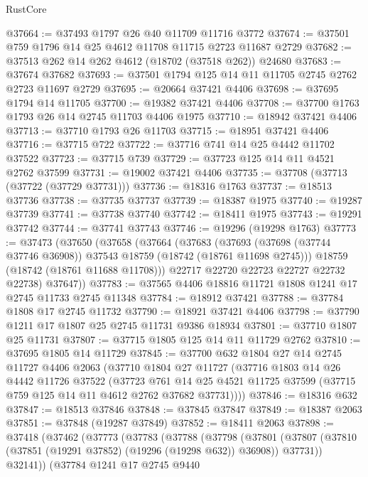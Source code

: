 \begin{lexlean}{RustCore}
\begin{coremodule}
@37664 := @37493 @1797 @26 @40 @11709 @11716 @3772
@37674 := @37501 @759 @1796 @14 @25 @4612 @11708 @11715 @2723 @11687 @2729
@37682 := @37513 @262 @14 @262 @4612 (@18702 (@37518 @262)) @24680
@37683 := @37674 @37682
@37693 := @37501 @1794 @125 @14 @11 @11705 @2745 @2762 @2723 @11697 @2729
@37695 := @20664 @37421 @4406
@37698 := @37695 @1794 @14 @11705
@37700 := @19382 @37421 @4406
@37708 := @37700 @1763 @1793 @26 @14 @2745 @11703 @4406 @1975
@37710 := @18942 @37421 @4406
@37713 := @37710 @1793 @26 @11703
@37715 := @18951 @37421 @4406
@37716 := @37715 @722
@37722 := @37716 @741 @14 @25 @4442 @11702 @37522
@37723 := @37715 @739
@37729 := @37723 @125 @14 @11 @4521 @2762 @37599
@37731 := @19002 @37421 @4406
@37735 := @37708 (@37713 (@37722 (@37729 @37731)))
@37736 := @18316 @1763
@37737 := @18513 @37736
@37738 := @37735 @37737
@37739 := @18387 @1975
@37740 := @19287 @37739
@37741 := @37738 @37740
@37742 := @18411 @1975
@37743 := @19291 @37742
@37744 := @37741 @37743
@37746 := @19296 (@19298 @1763)
@37773 := @37473
    (@37650
      (@37658
        (@37664
          (@37683
            (@37693 (@37698 (@37744 @37746 @36908)) @37543 @18759 (@18742 (@18761 @11698 @2745)))
            @18759
            (@18742 (@18761 @11688 @11708)))
          @22717
          @22720
          @22723
          @22727
          @22732
          @22738)
        @37647))
@37783 := @37565 @4406 @18816 @11721 @1808 @1241 @17 @2745 @11733 @2745 @11348
@37784 := @18912 @37421
@37788 := @37784 @1808 @17 @2745 @11732
@37790 := @18921 @37421 @4406
@37798 := @37790 @1211 @17 @1807 @25 @2745 @11731 @9386 @18934
@37801 := @37710 @1807 @25 @11731
@37807 := @37715 @1805 @125 @14 @11 @11729 @2762
@37810 := @37695 @1805 @14 @11729
@37845 := @37700
    @632
    @1804
    @27
    @14
    @2745
    @11727
    @4406
    @2063
    (@37710
      @1804
      @27
      @11727
      (@37716
        @1803
        @14
        @26
        @4442
        @11726
        @37522
        (@37723
          @761
          @14
          @25
          @4521
          @11725
          @37599
          (@37715 @759 @125 @14 @11 @4612 @2762 @37682 @37731))))
@37846 := @18316 @632
@37847 := @18513 @37846
@37848 := @37845 @37847
@37849 := @18387 @2063
@37851 := @37848 (@19287 @37849)
@37852 := @18411 @2063
@37898 := @37418
    (@37462
      (@37773
        (@37783
          (@37788
            (@37798
              (@37801
                (@37807 (@37810 (@37851 (@19291 @37852) (@19296 (@19298 @632)) @36908)) @37731))
              @32141))
          (@37784
            @1241
            @17
            @2745
            @9440

\end{coremodule}
\end{lexlean}
